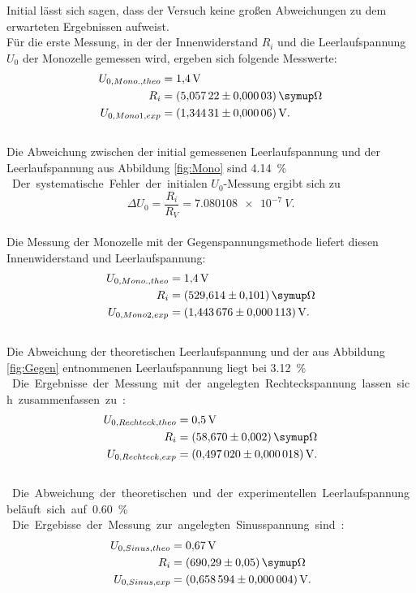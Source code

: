 Initial lässt sich sagen, dass der Versuch keine großen Abweichungen zu dem erwarteten Ergebnissen aufweist.
\\Für die erste Messung, in der der Innenwiderstand $R_{i}$ und die Leerlaufspannung $U_{0}$ der Monozelle gemessen wird, ergeben sich folgende Messwerte:
\begin{align*}
  U_{0, Mono., theo} &= \SI{1.4}{V}\\
  R_{i} &= \SI{5.05722 \pm 0.00003}{\symup\Omega}\\
  U_{0, Mono1, exp} &= \SI{1.34431 \pm 0.00006}{V}.
\end{align*}
\\Die Abweichung zwischen der initial gemessenen Leerlaufspannung und der Leerlaufspannung aus Abbildung \ref{fig:Mono} sind \SI{4.14}\%.
\\Der systematische Fehler der initialen $U_{0}$-Messung ergibt sich zu
\begin{equation*}
  \Delta U_{0}=\frac{R_{i}}{R_{V}}=\SI{7.080108e-7}{V}.
\end{equation*}
\\Die Messung der Monozelle mit der Gegenspannungsmethode liefert diesen Innenwiderstand und Leerlaufspannung:
\begin{align*}
  U_{0, Mono., theo} &= \SI{1.4}{V}\\
  R_{i} &= \SI{529.614 \pm 0.101}{\symup\Omega}\\
  U_{0, Mono2, exp} &= \SI{1.443676 \pm 0.000113}{V}.
\end{align*}
\\Die Abweichung der theoretischen Leerlaufspannung und der aus Abbildung \ref{fig:Gegen} entnommenen Leerlaufspannung liegt bei \SI{3.12}\%.
\\Die Ergebnisse der Messung mit der angelegten Rechteckspannung lassen sich zusammenfassen zu:
\begin{align*}
  U_{0, Rechteck, theo} &=\SI{0.5}{V}\\
  R_{i} &= \SI{58.67 \pm 0.002}{\symup\Omega}\\
  U_{0, Rechteck, exp} &=\SI{0.497020 \pm 0.000018}{V}.
\end{align*}
\\Die Abweichung der theoretischen und der experimentellen Leerlaufspannung beläuft sich auf \SI{0.60}\%
\\Die Ergebisse der Messung zur angelegten Sinusspannung sind:
\begin{align*}
  U_{0, Sinus, theo} &=\SI{0.67}{V}\\
  R_{i} &= \SI{690.29 \pm 0.05}{\symup\Omega}\\
  U_{0, Sinus, exp} &=\SI{0.658594 \pm 0.000004}{V}.
\end{align*}
